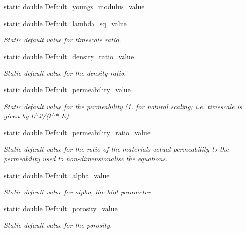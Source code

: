 \begin{DoxyCompactItemize}
\item 
static double \hyperlink{classoomph_1_1AxisymmetricPoroelasticityEquations_a0bd775ccc38f69fd16e8678a23db365d}{Default\+\_\+youngs\+\_\+modulus\+\_\+value}
\item 
static double \hyperlink{classoomph_1_1AxisymmetricPoroelasticityEquations_a021776a6428924f3343e04a23b9dfe04}{Default\+\_\+lambda\+\_\+sq\+\_\+value}
\begin{DoxyCompactList}\small\item\em Static default value for timescale ratio. \end{DoxyCompactList}\item 
static double \hyperlink{classoomph_1_1AxisymmetricPoroelasticityEquations_ac67c57bc6dcb8fa8d8c58ecbb09ad53a}{Default\+\_\+density\+\_\+ratio\+\_\+value}
\begin{DoxyCompactList}\small\item\em Static default value for the density ratio. \end{DoxyCompactList}\item 
static double \hyperlink{classoomph_1_1AxisymmetricPoroelasticityEquations_a6db649a350e27d487c33ec712aa2e40c}{Default\+\_\+permeability\+\_\+value}
\begin{DoxyCompactList}\small\item\em Static default value for the permeability (1. for natural scaling; i.\+e. timescale is given by L$^\wedge$2/(k$^\wedge$$\ast$ E) \end{DoxyCompactList}\item 
static double \hyperlink{classoomph_1_1AxisymmetricPoroelasticityEquations_a73f4b8d00592722d7e27601db1347968}{Default\+\_\+permeability\+\_\+ratio\+\_\+value}
\begin{DoxyCompactList}\small\item\em Static default value for the ratio of the material\textquotesingle{}s actual permeability to the permeability used to non-\/dimensionalise the equations. \end{DoxyCompactList}\item 
static double \hyperlink{classoomph_1_1AxisymmetricPoroelasticityEquations_ad2defb50925cb287018141185745d3f9}{Default\+\_\+alpha\+\_\+value}
\begin{DoxyCompactList}\small\item\em Static default value for alpha, the biot parameter. \end{DoxyCompactList}\item 
static double \hyperlink{classoomph_1_1AxisymmetricPoroelasticityEquations_a4de60dac650962d5a12f48e8493b28ac}{Default\+\_\+porosity\+\_\+value}
\begin{DoxyCompactList}\small\item\em Static default value for the porosity. \end{DoxyCompactList}\end{DoxyCompactItemize}
